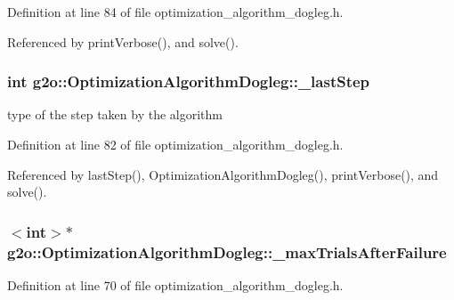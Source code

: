 Definition at line 84 of file optimization\+\_\+algorithm\+\_\+dogleg.\+h.



Referenced by print\+Verbose(), and solve().

\subsubsection[{\texorpdfstring{\+\_\+last\+Step}{_lastStep}}]{\setlength{\rightskip}{0pt plus 5cm}int g2o\+::\+Optimization\+Algorithm\+Dogleg\+::\+\_\+last\+Step\hspace{0.3cm}{\ttfamily [protected]}}\hypertarget{classg2o_1_1OptimizationAlgorithmDogleg_a3bf898af0087c0ed8287d0cd13e4c943}{}\label{classg2o_1_1OptimizationAlgorithmDogleg_a3bf898af0087c0ed8287d0cd13e4c943}


type of the step taken by the algorithm 



Definition at line 82 of file optimization\+\_\+algorithm\+\_\+dogleg.\+h.



Referenced by last\+Step(), Optimization\+Algorithm\+Dogleg(), print\+Verbose(), and solve().

\subsubsection[{\texorpdfstring{\+\_\+max\+Trials\+After\+Failure}{_maxTrialsAfterFailure}}]{$<$int$>$$\ast$ g2o\+::\+Optimization\+Algorithm\+Dogleg\+::\+\_\+max\+Trials\+After\+Failure\hspace{0.3cm}{\ttfamily [protected]}}\hypertarget{classg2o_1_1OptimizationAlgorithmDogleg_a5993c68e69cd037b1420b4addf9f7e50}{}\label{classg2o_1_1OptimizationAlgorithmDogleg_a5993c68e69cd037b1420b4addf9f7e50}


Definition at line 70 of file optimization\+\_\+algorithm\+\_\+dogleg.\+h.




